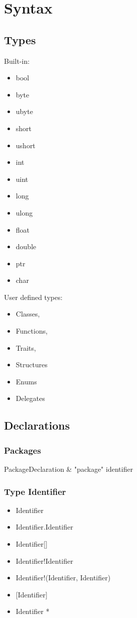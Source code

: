 \section{Syntax}


\subsection{Types}
Built-in:
\begin{multicols}{4}
\begin{itemize}
\item bool 
\item byte 
\item ubyte 
\item short 
\item ushort 
\item int 
\item uint 
\item long 
\item ulong 
\item float 
\item double 
\item ptr 
\item char 
\end{itemize}
\end{multicols}

User defined types:
\begin{itemize}
\item Classes, 
\item Functions, 
\item Traits, 
\item Structures
\item Enums
\item Delegates
\end{itemize}

\subsection{Declarations}

\subsubsection*{Packages}

\begin{ebnf}
PackageDeclaration & \rightarrow "package" identifier\; \\
\end{ebnf}

\subsubsection{Type Identifier}
\begin{itemize}
\item Identifier
\item Identifier.Identifier
\item Identifier[]
\item Identifier!Identifier
\item Identifier!(Identifier, Identifier)
\item {[}Identifier]
\item Identifier *
\end{itemize}



